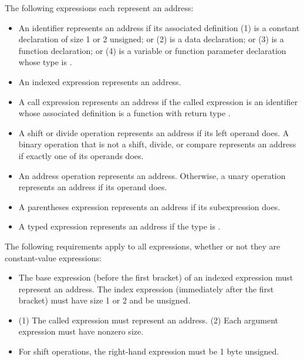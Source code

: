 \documentclass[10pt]{article}
\begin{document}
 The following expressions each represent
an address:
%
\begin{itemize}
%
\item {} An identifier represents an address if its
  associated definition (1) is a constant declaration of size 1 or 2
  unsigned; or (2) is a data declaration; or (3) is a function
  declaration; or (4) is a variable or function parameter declaration
  whose type is .
%
\item {} An indexed expression represents
  an address.
%
\item {}  A call expression represents an
  address if the called expression is an identifier whose associated
  definition is a function with return type .
%
\item {} A shift or divide operation
  represents an address if its left operand does.  A binary operation
  that is not a shift, divide, or compare represents an address if
  exactly one of its operands does.
%
\item {} An address operation
   represents an address.  Otherwise, a unary operation
  represents an address if its operand does.
%
\item {} A parentheses expression
  represents an address if its subexpression does.
%
\item {} A typed expression represents an
  address if the type is .
%
\end{itemize}

The following requirements apply to all expressions, whether or not
they are constant-value expressions:
%
\begin{itemize}
%
\item {} The base expression (before the
  first bracket) of an indexed expression must represent an address.
  The index expression (immediately after the first bracket) must have
  size 1 or 2 and be unsigned.
%
\item {} (1) The called expression must
  represent an address.  (2) Each argument expression must have
  nonzero size.
%
\item {}  For shift operations,
  the right-hand expression must be 1 byte unsigned.
%
\end{itemize}
\end{document}

